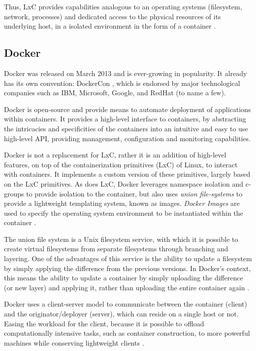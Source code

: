 \documentclass[12pt, titlepage]{uo_temp}
\begin{document}
     Thus, LxC provides capabilities analogous to an operating systems (filesystem, network,
     processes) and dedicated access to the physical resources of its underlying host, in a
     isolated environment in the form of a container \cite{dell}.

     \subsection{Docker}\label{bkg_docker}
     Docker was released on March 2013 and is ever-growing in popularity. It already has
     its own convention: DockerCon \cite{dockercon}, which is endorsed by major
     technological companies such as IBM, Microsoft, Google, and RedHat (to name a few).

     Docker is open-source and provide means to automate deployment of applications within
     containers. It provides a high-level interface to containers, by abstracting the
     intricacies and specificities of the containers into an intuitive and easy to use
     high-level API, providing management, configuration and monitoring capabilities.

     Docker is not a replacement for LxC, rather it is an addition of high-level features,
     on top of the containerization primitives (LxC) of Linux, to interact with
     containers. It implements a custom version of these primitives, largely
     based on the LxC primitives. As does LxC, Docker leverages namespace isolation and
     c-groups to provide isolation to the container, but also uses \emph{union
       file-systems} to provide a lightweight templating system, known as
     images. \emph{Docker Images} are used to specify the operating system environment to
     be instantiated within the container \cite{docker}.

     The union file system is a Unix filesystem service, with which it is possible to
     create virtual filesystems from separate filesystems through branching and
     layering. One of the advantages of this service is the ability to update a filesystem
     by simply applying the difference from the previous versions. In Docker's context,
     this means the ability to update a container by simply uploading the difference (or
     new layer) and applying it, rather than uploading the entire container again \cite{docker}.

     Docker uses a client-server model to communicate between the container (client) and
     the originator/deployer (server), which can reside on a single host or not. Easing
     the workload for the client, because it is possible to offload computationally
     intensive tasks, such as container construction, to more powerful machines while
     conserving lightweight clients \cite{docker}.
\end{document}
